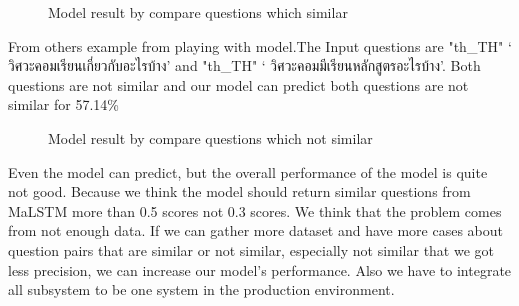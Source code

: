 \documentclass[12pt,oneside,openright,a4paper]{cpe-english-project}
\begin{document}
\begin{figure}[!h]\centering
\setlength{\fboxrule}{0.2mm} %
\setlength{\fboxsep}{1cm}
\caption{Model result by compare questions which similar}\label{fig:Model result by compare questions which similar}
\end{figure}

From others example from playing with model.The Input questions are
{
\XeTeXlinebreaklocale "th_TH"	
\thaifont 
 ‘ วิศวะคอมเรียนเกี่ยวกับอะไรบ้าง’ }and 
{
\XeTeXlinebreaklocale "th_TH"	
\thaifont ‘ วิศวะคอมมีเรียนหลักสูตรอะไรบ้าง’.}
 Both questions are not similar and our model can predict both questions are not similar for 57.14\%

\begin{figure}[!h]\centering
\setlength{\fboxrule}{0.2mm} %
\setlength{\fboxsep}{1cm}
\caption{Model result by compare questions which not similar}\label{fig:Model result by compare questions which not similar}
\end{figure}

Even the model can predict, but the overall performance of the model is quite not good. Because we think the model should return similar questions from MaLSTM more than 0.5 scores not 0.3 scores. We think that the problem comes from not enough data. If we can gather more dataset and have more cases about question pairs that are similar or not similar, especially not similar that we got less precision, we can increase our model's performance. Also we have to integrate all subsystem to be one system in the production environment.

\end{document}
